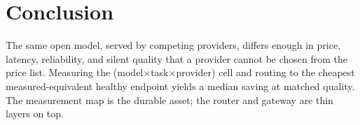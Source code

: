 \documentclass{article}
\begin{document}
\section{Conclusion}
The same open model, served by competing providers, differs enough in price, latency,
reliability, and silent quality that a provider cannot be chosen from the price list. Measuring
the (model$\times$task$\times$provider) cell and routing to the cheapest measured-equivalent
healthy endpoint yields a median \medsave{} saving at matched quality. The measurement map is
the durable asset; the router and gateway are thin layers on top.



\end{document}
